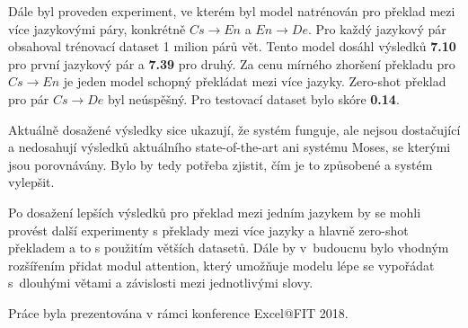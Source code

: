 Dále byl proveden experiment, ve kterém byl model natrénován pro překlad mezi více jazykovými páry, konkrétně $Cs\rightarrow En$ a $En\rightarrow De$. Pro každý jazykový pár obsahoval trénovací dataset 1 milion párů vět. Tento model dosáhl výsledků \textbf{7.10} pro první jazykový pár a \textbf{7.39} pro druhý. Za cenu mírného zhoršení překladu pro $Cs\rightarrow En$ je jeden model schopný překládat mezi více jazyky. Zero-shot překlad pro pár $Cs\rightarrow De$ byl neúspěšný. Pro testovací dataset bylo skóre \textbf{0.14}.

Aktuálně dosažené výsledky sice ukazují, že systém funguje, ale nejsou dostačující a nedosahují výsledků aktuálního state-of-the-art ani systému Moses, se kterými jsou porovnávány. Bylo by tedy potřeba zjistit, čím je to způsobené a systém vylepšit.

Po dosažení lepších výsledků pro překlad mezi jedním jazykem by se mohli provést další experimenty s překlady mezi více jazyky a hlavně zero-shot překladem a to s použitím větších datasetů. Dále by v~budoucnu bylo vhodným rozšířením přidat modul attention, který umožňuje modelu lépe se vypořádat s~dlouhými větami a závislosti mezi jednotlivými slovy.

Práce byla prezentována v rámci konference Excel@FIT 2018.

%

